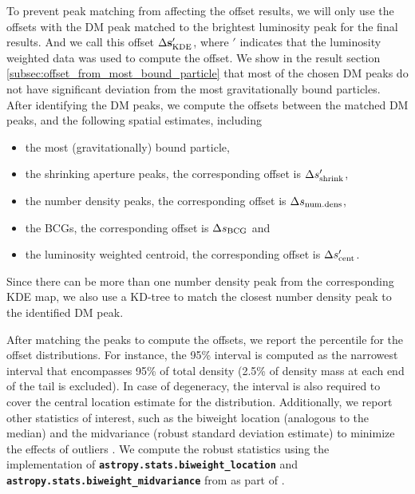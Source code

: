 To prevent peak matching from affecting the offset results,
we will only use the offsets with the DM peak matched to the brightest
luminosity peak for the final results.
And we call this offset $\Delta {\bf s}_{\rm KDE}'$, where $'$ indicates that the
luminosity weighted data was used to compute the offset. 
We show in the result section \ref{subsec:offset_from_most_bound_particle} 
that most of the chosen DM peaks
do not have significant deviation from the most gravitationally bound particles.
After identifying the DM peaks, we compute the 
offsets between the matched DM peaks, and the following spatial estimates, including 
\begin{itemize}
	\item the most (gravitationally) bound particle, 
	\item the shrinking aperture peaks, the corresponding offset is $\Delta s_{\rm
		shrink}'$, 
	\item the number density peaks, the corresponding offset is $\Delta s_{\rm
		num.dens}$, 
	\item the BCGs, the corresponding offset is $\Delta s_{\rm BCG}$ and
\item the luminosity weighted centroid, the corresponding offset is $\Delta
	s_{\rm cent}'$.
\end{itemize}
Since there can be more than one number density peak from the corresponding KDE
map, we also use a KD-tree to match the closest number density peak to the 
identified DM peak.

After matching the peaks to compute the offsets, 
we report the percentile for the offset distributions.
For instance, the 95\% interval is computed as the narrowest interval that encompasses
95\% of total density (2.5\% of density mass at each end of the tail is
excluded). In case of degeneracy, the interval is also required to cover the 
central location estimate for the distribution.
Additionally, we report other statistics of interest, such as the biweight 
location (analogous to the median)
and the midvariance (robust standard deviation
estimate) to minimize the effects of outliers \citep{Beers90}. 
We compute the robust statistics using the 
implementation of {\bf \texttt{astropy.stats.biweight\_location}}
and {\bf \texttt{astropy.stats.biweight\_midvariance}}
from \cite{astropy} as part of {}. 

